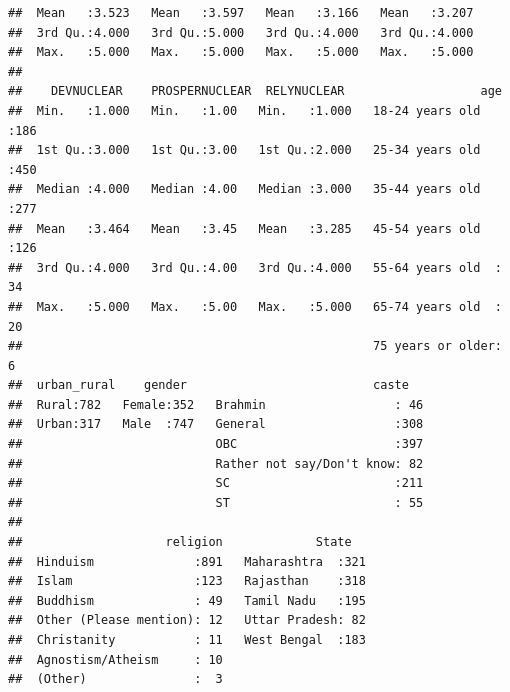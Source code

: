 \documentclass[
]{article}
\begin{document}
\begin{verbatim}
##  Mean   :3.523   Mean   :3.597   Mean   :3.166   Mean   :3.207  
##  3rd Qu.:4.000   3rd Qu.:5.000   3rd Qu.:4.000   3rd Qu.:4.000  
##  Max.   :5.000   Max.   :5.000   Max.   :5.000   Max.   :5.000  
##                                                                 
##    DEVNUCLEAR    PROSPERNUCLEAR  RELYNUCLEAR                   age     
##  Min.   :1.000   Min.   :1.00   Min.   :1.000   18-24 years old  :186  
##  1st Qu.:3.000   1st Qu.:3.00   1st Qu.:2.000   25-34 years old  :450  
##  Median :4.000   Median :4.00   Median :3.000   35-44 years old  :277  
##  Mean   :3.464   Mean   :3.45   Mean   :3.285   45-54 years old  :126  
##  3rd Qu.:4.000   3rd Qu.:4.00   3rd Qu.:4.000   55-64 years old  : 34  
##  Max.   :5.000   Max.   :5.00   Max.   :5.000   65-74 years old  : 20  
##                                                 75 years or older:  6  
##  urban_rural    gender                          caste    
##  Rural:782   Female:352   Brahmin                  : 46  
##  Urban:317   Male  :747   General                  :308  
##                           OBC                      :397  
##                           Rather not say/Don't know: 82  
##                           SC                       :211  
##                           ST                       : 55  
##                                                          
##                    religion             State    
##  Hinduism              :891   Maharashtra  :321  
##  Islam                 :123   Rajasthan    :318  
##  Buddhism              : 49   Tamil Nadu   :195  
##  Other (Please mention): 12   Uttar Pradesh: 82  
##  Christanity           : 11   West Bengal  :183  
##  Agnostism/Atheism     : 10                      
##  (Other)               :  3
\end{verbatim}
\end{document}
